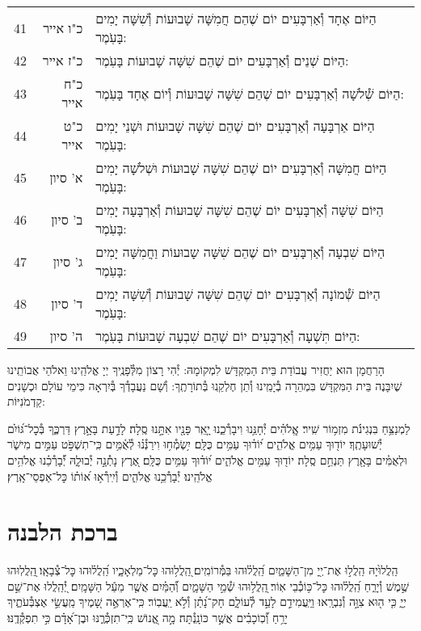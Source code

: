 \documentclass[twoside, openany, parskip=half, 11pt]{book}
\begin{document}
\begin{scriptsize}
\begin{longtable}{ l | r | p{} }
41 & כ"ו אייר & הַיּוֹם אֶחָד וְ֯אַרְבָּעִים יוֹם שֶׁהֵם חֲמִשָּׁה שָׁבוּעוֹת וְ֯שִׁשָּׁה יָמִים בָּעֹֽמֶר: \\
42 & כ"ז אייר & הַיּוֹם שְׁנֵים וְ֯אַרְבָּעִים יוֹם שֶׁהֵם שִׁשָּׁה שָׁבוּעוֹת בָּעֹֽמֶר: \\
43 & כ"ח אייר & הַיּוֹם שְׁ֯לֹשָׁה וְ֯אַרְבָּעִים יוֹם שֶׁהֵם שִׁשָּׁה שָׁבוּעוֹת וְ֯יוֹם אֶחָד בָּעֹֽמֶר: \\
44 & כ"ט אייר & הַיּוֹם אַרְבָּעָה וְ֯אַרְבָּעִים יוֹם שֶׁהֵם שִׁשָּׁה שָׁבוּעוֹת וּשְׁנֵי יָמִים בָּעֹֽמֶר: \\
45 & א' סיון & הַיּוֹם חֲמִשָּׁה וְ֯אַרְבָּעִים יוֹם שֶׁהֵם שִׁשָּׁה שָׁבוּעוֹת וּשְׁלֹשָׁה יָמִים בָּעֹֽמֶר: \\
46 & ב' סיון & הַיּוֹם שִׁשָּׁה וְ֯אַרְבָּעִים יוֹם שֶׁהֵם שִׁשָּׁה שָׁבוּעוֹת וְ֯אַרְבָּעָה יָמִים בָּעֹֽמֶר: \\
47 & ג' סיון & הַיּוֹם שִׁבְעָה וְ֯אַרְבָּעִים יוֹם שֶׁהֵם שִׁשָּׁה שָבוּעוֹת וַחֲמִשָּׁה יָמִים בָּעֹֽמֶר: \\
48 & ד' סיון & הַיּוֹם שְׁ֯מוֹנָה וְ֯אַרְבָּעִים יוֹם שֶׁהֵם שִׁשָּׁה שָׁבוּעוֹת וְ֯שִׁשָּׁה יָמִים בָּעֹֽמֶר: \\
49 & ה' סיון & הַיּוֹם תִּשְׁעָה וְ֯אַרְבָּעִים יוֹם שֶׁהֵם שִׁבְעָה שָׁבוּעוֹת בָּעֹֽמֶר:
\end{longtable}
\end{scriptsize}



הָרַחֲמָן הוּא יַחֲזִיר עֲבוֹדַת בֵּית הַמִקְדָּשׁ לִמְקוֹמָהּ:
יְ֯הִי רָצוֹן מִלְּ֯פָנֶֽיךָ יְיָ אֱלֹהֵֽינוּ וֵאלֹהֵי אֲבוֹתֵֽינוּ שֶׁיִבָּנֶה בֵּית הַמִּקְדָּשׁ בִּמְהֵרָה בְ֯יָמֵֽינוּ וְ֯תֵן חֶלְקֵֽנוּ בְּ֯תוֹרָתֶֽךָ: וְ֯שָׁם נַעֲבָדְ֯ךָ בְּ֯יִרְאָה כִּימֵי עוֹלָם וּכְשָׁנִים קַדְמֹנִיּוֹת:


לַמְנַצֵּ֥חַ בִּנְגִינֹ֗ת מִזְמ֥וֹר שִֽׁיר׃ אֱֽלֹהִ֗ים יְ֯חָנֵּ֥נוּ וִיבָרְ֯כֵ֑נוּ יָ֤אֵֽר פָּנָ֖יו אִתָּ֣נוּ סֶֽלָה׃ לָדַ֣עַת בָּאָ֣רֶץ דַּרְכֶּ֑ךָ בְּ֯כׇל־גּ֝וֹיִ֗ם יְ֯שׁוּעָתֶֽךָ׃ יוֹד֖וּךָ עַמִּ֥ים אֱלֹהִ֑ים י֝וֹד֗וּךָ עַמִּ֥ים כֻּלָּֽם׃ יִ֥שְׂמְ֯ח֥וּ וִירַנְּ֯נ֗וּ לְ֯אֻ֫מִּ֥ים כִּֽי־תִשְׁפֹּ֣ט עַמִּ֣ים מִישֹׁ֑ר וּלְאֻמִּ֓ים בָּאָ֖רֶץ תַּנְחֵ֣ם סֶֽלָה׃ יוֹד֖וּךָ עַמִּ֥ים אֱלֹהִ֑ים י֝וֹד֗וּךָ עַמִּ֥ים כֻּלָּֽם׃ אֶ֭רֶץ נָתְ֯נָ֣ה יְ֯בוּלָ֑הּ יְ֯֝בָרְ֯כֵ֗נוּ אֱלֹהִ֥ים
אֱלֹהֵֽינוּ׃ יְ֯בָרְ֯כֵ֥נוּ אֱלֹהִ֑ים וְ֯יִֽירְ֯א֥וּ א֝וֹת֗וֹ כׇּל־אַפְסֵי־אָֽרֶץ׃

\section[ברכת הלבנה]{ ברכת הלבנה }

הַֽלֲלוּ֙יָהּ הַֽלֲל֣וּ אֶת־יְ֖יָ מִן־הַשָּׁמַ֑יִם הַֽ֝לֲל֗וּהוּ בַּמְּ֯רוֹמִֽים׃
֭הַֽלֲל֥וּהוּ כׇּל־מַלְאָכָ֑יו הַֽ֝לֲל֗וּהוּ כׇּל־צְ֯בָאָֽו׃
֖הַֽלֲלֽוּהוּ שֶׁ֣מֶשׁ וְ֯יָרֵ֑חַ הַֽ֝לֲל֗וּהוּ כׇּל־כּ֥וֹכְ֯בֵי אֽוֹר׃
֖הַֽלֲל֥וּהוּ שְׁ֯מֵ֣י הַשָּׁמָ֑יִם וְ֝֯הַמַּ֗יִם אֲשֶׁ֤ר מֵעַ֬ל הַשָּׁמָֽיִם׃
יְ֭֯הַֽלֲלוּ אֶת־שֵׁ֣ם יְיָ֑ כִּ֤י ה֖וּא צִוָּ֣ה וְ֯נִבְרָֽאוּ׃
וַיַּֽעֲמִידֵ֣ם לָעַ֣ד לְ֯עוֹלָ֑ם חָק־נָ֝תַ֗ן וְ֯לֹ֣א יַֽעֲבֽוֹר׃
כִּֽי־אֶרְאֶ֣ה שָׁ֭מֶיךָ מַֽעֲשֵׂ֣י אֶצְבְּ֯עֹתֶ֑יךָ יָרֵ֥חַ וְ֝֯כֽוֹכָבִ֗ים אֲשֶׁ֣ר כּוֹנָֽנְ֯תָּה׃
מָ֣ה אֱ֭נוֹשׁ כִּֽי־תִזְכְּ֯רֶ֑נּוּ וּבֶן־אָ֝דָ֗ם כִּ֣י תִפְקְ֯דֶֽנּוּ׃
\end{document}
